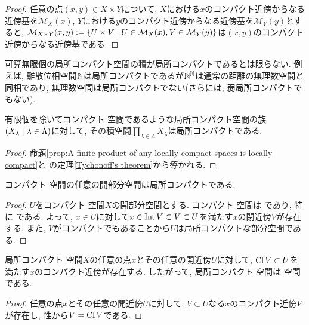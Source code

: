 \documentclass[uplatex, dvipdfmx, a4paper, 12pt, class=jsbook, crop=false]{standalone}
\begin{document}
\begin{proof}
	任意の点$ (x, y) \in X \times Y $について, $ X $における$ x $のコンパクト近傍からなる近傍基を$ \mathcal{M}_X(x) $, $ Y $における$ y $のコンパクト近傍からなる近傍基を$ \mathcal{M}_Y(y) $とすると, $ \mathcal{M}_{X \times Y}(x, y) \defeq \setcomp{U \times V}{U \in \mathcal{M}_X(x), V \in \mathcal{M}_Y(y)} $は$ (x, y) $のコンパクト近傍からなる近傍基である.
\end{proof}

可算無限個の局所コンパクト空間の積が局所コンパクトであるとは限らない. 例えば, 離散位相空間$ \mathbb{N} $は局所コンパクトであるが$ \mathbb{N}^{\mathbb{N}} $は通常の距離の無理数空間と同相であり, 無理数空間は局所コンパクトでない(さらには, 弱局所コンパクトでもない).

\begin{corollary}
	有限個を除いてコンパクト \Hausdorff 空間であるような局所コンパクト空間の族$ \setfamily{X_\lambda}{\lambda \in \Lambda} $に対して, その積空間$ \prod_{\lambda \in \Lambda} X_\lambda $は局所コンパクトである.
\end{corollary}

\begin{proof}
	命題\ref{prop:A finite product of any locally compact spaces is locally compact}と \Tychonoff の定理\ref{Tychonoff's theorem}から導かれる.
\end{proof}

\begin{proposition}
	コンパクト \Hausdorff 空間の任意の開部分空間は局所コンパクトである.
\end{proposition}
\begin{proof}
	$ U $をコンパクト \Hausdorff 空間$ X $の開部分空間とする. コンパクト \Hausdorff 空間は  であり, 特に  である. よって, $ x \in U $に対して$ x \in \mathop{\mathrm{Int}}\nolimits V \subset V \subset U $を満たす$ x $の閉近傍$ V $が存在する. また, $ V $がコンパクトでもあることから$ U $は局所コンパクトな部分空間である.
\end{proof}

\begin{lemma}
	\label{lccpt00001}
	局所コンパクト \Hausdorff 空間$ X $の任意の点$ x $とその任意の開近傍$ U $に対して, $ \mathop{\mathrm{Cl}}\nolimits V \subset U $を満たす$ x $のコンパクト近傍が存在する. したがって, 局所コンパクト \Hausdorff 空間は  空間である.
\end{lemma}

\begin{proof}
	任意の点$ x $とその任意の開近傍$ U $に対して, $ V \subset U $なる$ x $のコンパクト近傍$ V $が存在し, \Hausdorff 性から$ V = \mathop{\mathrm{Cl}}\nolimits V $である.
\end{proof}
\end{document}
